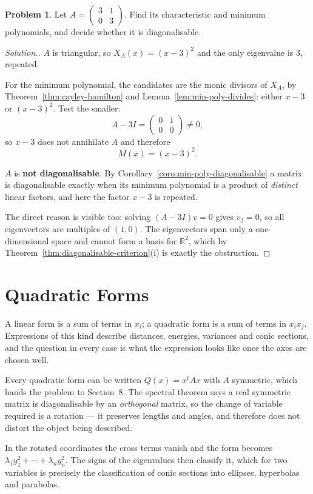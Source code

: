 \documentclass[11pt,a4paper]{article}
\theoremstyle{definition}
\newtheorem{problemx}{Problem}[section]
\newenvironment{problem}{\begin{problemx}}{\end{problemx}}
\newenvironment{solution}
  {\renewcommand{\qedsymbol}{}\begin{proof}[\textit{Solution}.]}
  {\end{proof}}
\begin{document}
\begin{problem}
Let $A=\begin{pmatrix}3&1\\0&3\end{pmatrix}$. Find its characteristic and
minimum polynomials, and decide whether it is diagonalisable.
\end{problem}
\begin{solution}
$A$ is triangular, so $X_A(x)=(x-3)^2$ and the only eigenvalue is $3$, repeated.

For the minimum polynomial, the candidates are the monic divisors of $X_A$, by
Theorem~\ref{thm:cayley-hamilton} and
Lemma~\ref{lem:min-poly-divides}: either $x-3$ or $(x-3)^2$. Test the smaller:
$$A-3I=\begin{pmatrix}0&1\\0&0\end{pmatrix}\neq 0,$$
so $x-3$ does not annihilate $A$ and therefore
$$M(x)=(x-3)^2.$$

$A$ is \textbf{not diagonalisable}. By
Corollary~\ref{coro:min-poly-diagonalisable} a matrix is diagonalisable exactly
when its minimum polynomial is a product of \emph{distinct} linear factors,
and here the factor $x-3$ is repeated.

The direct reason is visible too: solving $(A-3I)v=0$ gives $v_2=0$, so all
eigenvectors are multiples of $(1,0)$. The eigenvectors span only a
one-dimensional space and cannot form a basis for $\mathbb{R}^2$, which by
Theorem~\ref{thm:diagonalisable-criterion}(i) is exactly the obstruction.
\end{solution}

\pagebreak
\section{Quadratic Forms}
A linear form is a sum of terms in $x_i$; a quadratic form is a sum of terms in
$x_ix_j$. Expressions of this kind describe distances, energies, variances and
conic sections, and the question in every case is what the expression looks
like once the axes are chosen well.

Every quadratic form can be written $Q(x)=x^tAx$ with $A$ symmetric, which
hands the problem to Section~8. The spectral theorem says a real symmetric
matrix is diagonalisable by an \emph{orthogonal} matrix, so the change of
variable required is a rotation --- it preserves lengths and angles, and
therefore does not distort the object being described.

In the rotated coordinates the cross terms vanish and the form becomes
$\lambda_1y_1^2+\cdots+\lambda_ny_n^2$. The signs of the eigenvalues then
classify it, which for two variables is precisely the classification of conic
sections into ellipses, hyperbolas and parabolas.
\end{document}
